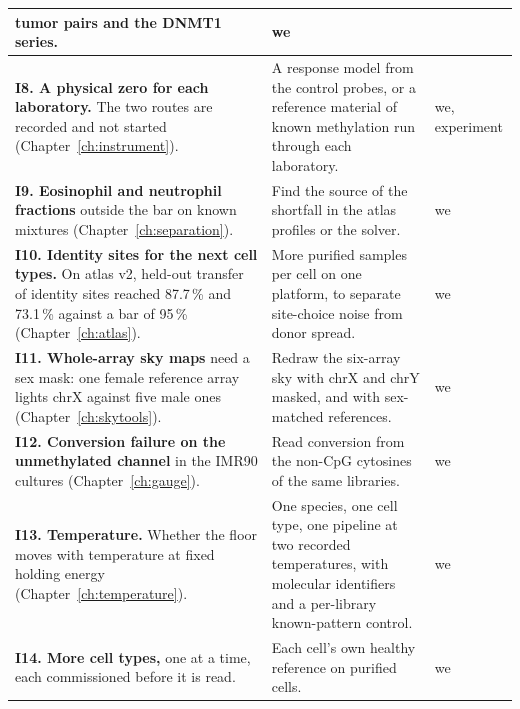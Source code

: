 {\begin{longtable}{@{}>{\raggedright\arraybackslash}p{}>{\raggedright\arraybackslash}p{}>{\raggedright\arraybackslash}p{}@{}}
 tumor pairs and the DNMT1 series. & we \\\cmidrule[0.2pt]{1-3}
\textbf{I8. A physical zero for each laboratory.} The two routes are recorded and not started (Chapter~\ref{ch:instrument}). & A response model from
 the control probes, or a reference material of known methylation run through each laboratory. & we, experiment \\\cmidrule[0.2pt]{1-3}
\textbf{I9. Eosinophil and neutrophil fractions} outside the bar on known mixtures (Chapter~\ref{ch:separation}). & Find the source of the shortfall
 in the atlas profiles or the solver. & we \\\cmidrule[0.2pt]{1-3}
\textbf{I10. Identity sites for the next cell types.} On atlas v2, held-out transfer of identity sites reached 87.7\,\% and 73.1\,\% against a bar of 95\,\% (Chapter~\ref{ch:atlas}). & More purified
 samples per cell on one platform, to separate site-choice noise from donor spread. & we \\\cmidrule[0.2pt]{1-3}
\textbf{I11. Whole-array sky maps} need a sex mask: one female reference array lights chrX against five male ones (Chapter~\ref{ch:skytools}). & Redraw the six-array sky with chrX and chrY masked, and with sex-matched references. & we \\\cmidrule[0.2pt]{1-3}
\textbf{I12. Conversion failure on the unmethylated channel} in the IMR90 cultures (Chapter~\ref{ch:gauge}). & Read conversion from the
 non-CpG cytosines of the same libraries. & we \\\cmidrule[0.2pt]{1-3}
\textbf{I13. Temperature.} Whether the floor moves with temperature at fixed holding energy (Chapter~\ref{ch:temperature}). & One species, one cell
 type, one pipeline at two recorded temperatures, with molecular identifiers and a per-library known-pattern control. & we \\\cmidrule[0.2pt]{1-3}
\textbf{I14. More cell types,} one at a time, each commissioned before it is read. & Each cell's own healthy reference on purified cells. & we \\
\bottomrule
\end{longtable}}

